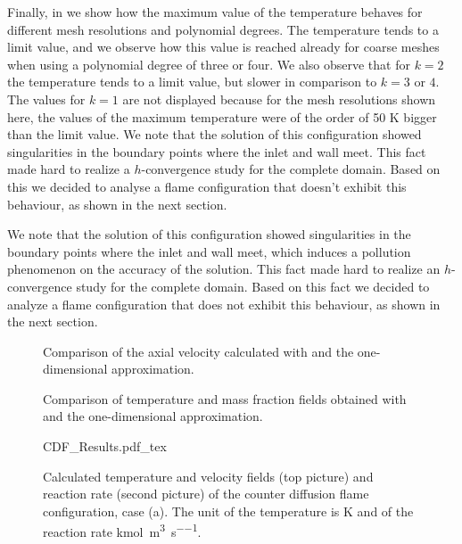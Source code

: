 Finally, in  we show how the maximum value of the temperature behaves for different mesh resolutions and polynomial degrees. The temperature tends to a limit value, and we observe how this value is reached already for coarse meshes when using a polynomial degree of three or four. We also observe that for $k=2$ the temperature tends to a limit value, but slower in comparison to $k =3$ or $4$. The values for $k=1$ are not displayed because for the mesh resolutions shown here, the values of the maximum temperature were of the order of 50 \si{K} bigger than the limit value. We note that the solution of this configuration showed singularities in the boundary points where the inlet and wall meet. This fact made hard to realize a $h$-convergence study for the complete domain. Based on this we decided to analyse a flame configuration that doesn't exhibit this behaviour, as shown in the next section.


We note that the solution of this configuration showed singularities in the boundary points where the inlet and wall meet, which induces a pollution phenomenon on the accuracy of the solution. This fact made hard to realize an $h$-convergence study for the complete domain. Based on this fact we decided to analyze a flame configuration that does not exhibit this behaviour, as shown in the next section.
\begin{figure}[t!]
	\centering
	\caption{ Comparison of the axial velocity calculated with \BoSSS and the one-dimensional approximation. }
	\label{fig:BoSSS_1D_Comparison_velocity}
\end{figure}
\newpage
\tikzexternaldisable
\begin{figure}[b!]
	\centering
	\caption{Comparison of temperature and mass fraction fields obtained with \BoSSS and the one-dimensional approximation.}
	\label{fig:BoSSS_1D_Comparison}
\end{figure}
\tikzexternalenable
\newpage
\begin{figure}[b]
	\begin{center}
		\def\svgwidth{0.8\textwidth}
		{CDF_Results.pdf_tex}
		\caption{Calculated temperature and velocity fields (top picture) and reaction rate (second picture) of the counter diffusion flame configuration, case (a). The unit of the temperature is \si{K} and of the reaction rate \si{\kilo\mole \per \meter \cubed \per \second}. }
		\label{fig:TempAndReacFields}
	\end{center}
\end{figure}

